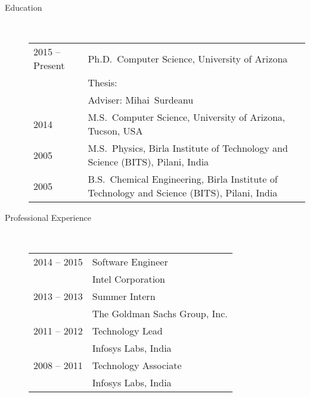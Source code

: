 \documentclass[10pt]{article}
\begin{document}
\begin{description}

\item [Education]\

\begin{tabular}{lp{4.5in}}
\hspace{-.2cm}2015 -- Present &  Ph.D.~Computer Science, {\sc University of Arizona}
\\\vspace{.0cm}&Thesis: 
\\\vspace{.1cm}& Adviser: Mihai~Surdeanu\\
\vspace{.1cm}\hspace{-.2cm}2014 &  M.S.~Computer Science, {\sc University of Arizona, Tucson, USA} \\
\vspace{.1cm}\hspace{-.2cm}2005 &  M.S.~Physics, {\sc Birla Institute of Technology and Science (BITS), Pilani, India} \\
\hspace{-.2cm}2005 & B.S.~Chemical Engineering,  {\sc Birla Institute of Technology and Science (BITS), Pilani, India}
\end{tabular}


\item [Professional Experience]\

\begin{tabular}{lp{4.9in}}


\hspace{-.2cm}2014 -- 2015 & Software Engineer\\\vspace{.1cm}
& {\sc Intel Corporation} \\

\hspace{-.2cm}2013 -- 2013 & Summer Intern\\\vspace{.1cm}
& {\sc The Goldman Sachs Group, Inc.} \\

\hspace{-.2cm}2011 -- 2012 & Technology Lead\\\vspace{.1cm}
&  {\sc Infosys Labs, India} \\

\hspace{-.2cm}2008 -- 2011 & Technology Associate\\\vspace{.1cm}
& {\sc Infosys Labs, India} \\


\end{tabular}
\end{description}
\end{document}
